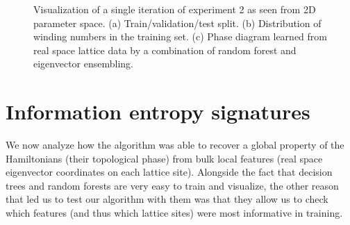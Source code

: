 \documentclass[fleqn,10pt]{wlscirep}
\begin{document}
\begin{figure}
\centering
{}\quad
{}
\caption{Visualization of a single iteration of experiment 2 as seen from 2D parameter space. (a) Train/validation/test split. (b) Distribution of winding numbers in the training set. (c) Phase diagram learned from real space lattice data by a combination of random forest and eigenvector ensembling.}
\label{figexp2_exp}
\end{figure}

\section*{Information entropy signatures}

We now analyze how the algorithm was able to recover a global property of the Hamiltonians (their topological phase) from bulk local features (real space eigenvector coordinates on each lattice site). Alongside the fact that decision trees and random forests are very easy to train and visualize, the other reason that led us to test our algorithm with them was that they allow us to check which features (and thus which lattice sites) were most informative in training.
\end{document}
